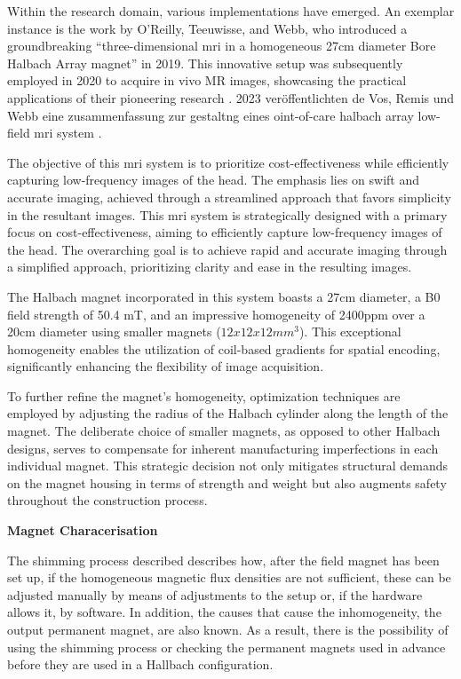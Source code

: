 Within the research domain, various implementations have emerged. An
exemplar instance is the work by O'Reilly, Teeuwisse, and Webb, who
introduced a groundbreaking ``three-dimensional \gls{mri} in a
homogeneous 27cm diameter Bore Halbach Array magnet''
\cite{OReilly2019-rn} in 2019. This innovative setup was
subsequently employed in 2020 to acquire in vivo MR images, showcasing
the practical applications of their pioneering research
\cite{OReilly2021-ep}. 2023 veröffentlichten de Vos, Remis und Webb
eine zusammenfassung zur gestaltng eines oint-of-care halbach array
low-field \gls{mri} system \cite{De_Vos2023-pb}.

The objective of this \gls{mri} system is to prioritize
cost-effectiveness while efficiently capturing low-frequency images of
the head. The emphasis lies on swift and accurate imaging, achieved
through a streamlined approach that favors simplicity in the resultant
images. This \gls{mri} system is strategically designed with a primary
focus on cost-effectiveness, aiming to efficiently capture low-frequency
images of the head. The overarching goal is to achieve rapid and
accurate imaging through a simplified approach, prioritizing clarity and
ease in the resulting images.

The Halbach magnet incorporated in this system boasts a 27cm diameter, a
B0 field strength of 50.4 mT, and an impressive homogeneity of
2400\gls{ppm} over a 20cm diameter using smaller magnets
(\(12 x 12 x 12 mm^3\)). This exceptional homogeneity enables the
utilization of coil-based gradients for spatial encoding, significantly
enhancing the flexibility of image acquisition.

To further refine the magnet's homogeneity, optimization techniques are
employed by adjusting the radius of the Halbach cylinder along the
length of the magnet. The deliberate choice of smaller magnets, as
opposed to other Halbach designs, serves to compensate for inherent
manufacturing imperfections in each individual magnet. This strategic
decision not only mitigates structural demands on the magnet housing in
terms of strength and weight but also augments safety throughout the
construction process.

\textbf{Magnet Characerisation}

The shimming process described describes how, after the field magnet has
been set up, if the homogeneous magnetic flux densities are not
sufficient, these can be adjusted manually by means of adjustments to
the setup or, if the hardware allows it, by software. In addition, the
causes that cause the inhomogeneity, the output permanent magnet, are
also known. As a result, there is the possibility of using the shimming
process or checking the permanent magnets used in advance before they
are used in a Hallbach configuration.

